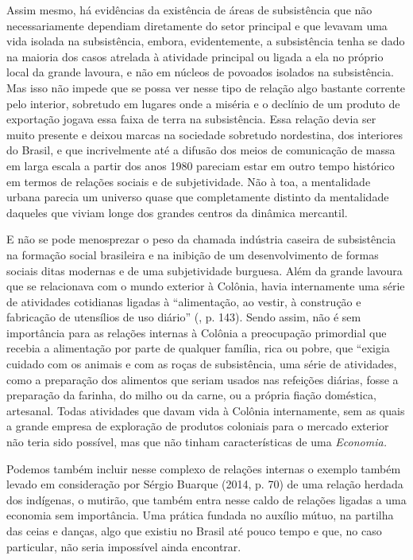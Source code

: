 Assim mesmo, há evidências da existência de áreas de subsistência que
não necessariamente dependiam diretamente do setor principal e que
levavam uma vida isolada na subsistência, embora, evidentemente, a
subsistência tenha se dado na maioria dos casos atrelada à atividade
principal ou ligada a ela no próprio local da grande lavoura, e não em
núcleos de povoados isolados na subsistência. Mas isso não impede que se
possa ver nesse tipo de relação algo bastante corrente pelo interior,
sobretudo em lugares onde a miséria e o declínio de um produto de
exportação jogava essa faixa de terra na subsistência. Essa relação
devia ser muito presente e deixou marcas na sociedade sobretudo
nordestina, dos interiores do Brasil, e que incrivelmente até a difusão
dos meios de comunicação de massa em larga escala a partir dos anos 1980
pareciam estar em outro tempo histórico em termos de relações sociais e
de subjetividade. Não à toa, a mentalidade urbana parecia um universo
quase que completamente distinto da mentalidade daqueles que viviam
longe dos grandes centros da dinâmica mercantil.

E não se pode menosprezar o peso da chamada indústria caseira de
subsistência na formação social brasileira e na inibição de um
desenvolvimento de formas sociais ditas modernas e de uma subjetividade
burguesa. Além da grande lavoura que se relacionava com o mundo exterior
à Colônia, havia internamente uma série de atividades cotidianas ligadas
à ``alimentação, ao vestir, à construção e fabricação de utensílios de
uso diário'' (, p. 143). Sendo assim, não é sem importância para
as relações internas à Colônia a preocupação primordial que recebia a
alimentação por parte de qualquer família, rica ou pobre, que ``exigia
cuidado com os animais e com as roças de subsistência, uma série de
atividades, como a preparação dos alimentos que seriam usados nas
refeições diárias, fosse a preparação da farinha, do milho ou da carne,
ou a própria fiação doméstica, artesanal. Todas atividades que davam
vida à Colônia internamente, sem as quais a grande empresa de exploração
de produtos coloniais para o mercado exterior não teria sido possível,
mas que não tinham características de uma \emph{Economia.}

Podemos também incluir nesse complexo de relações internas o exemplo
também levado em consideração por Sérgio Buarque (2014, p. 70) de uma
relação herdada dos indígenas, o mutirão, que também entra nesse caldo
de relações ligadas a uma economia sem importância. Uma prática fundada
no auxílio mútuo, na partilha das ceias e danças, algo que existiu no
Brasil até pouco tempo e que, no caso particular, não seria impossível
ainda encontrar.

